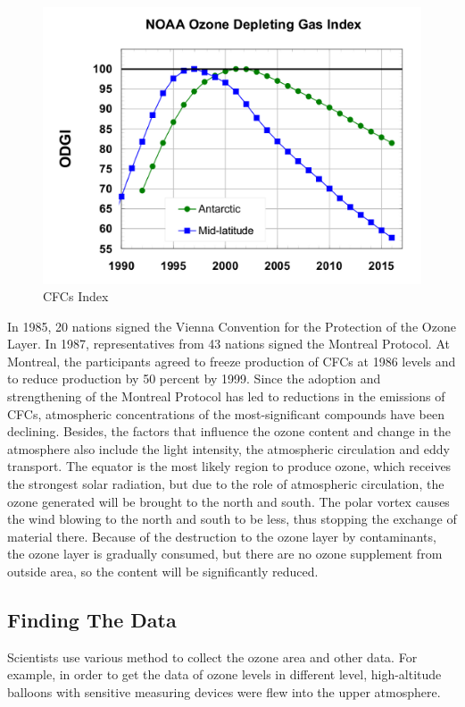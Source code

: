 \documentclass[12pt]{article}
\begin{document}
\begin{center}
\begin{figure}[htpb]
\centering
\includegraphics[scale=0.9]{cfc_index}
\caption{CFCs Index \cite{noaa.gov}}\label{fig:CFCs index}
\end{figure}
\end{center}



In 1985, 20 nations signed the Vienna Convention for the Protection of the Ozone Layer. In 1987, representatives from 43 nations signed the Montreal Protocol. At Montreal, the participants agreed to freeze production of CFCs at 1986 levels and to reduce production by 50 percent by 1999. Since the adoption and strengthening of the Montreal Protocol has led to reductions in the emissions of CFCs, atmospheric concentrations of the most-significant compounds have been declining.   Besides, the factors that influence the ozone content and change in the atmosphere also include the light intensity, the atmospheric circulation and eddy transport. The equator is the most likely region to produce ozone, which receives the strongest solar radiation, but due to the role of atmospheric circulation, the ozone generated will be brought to the north and south. The polar vortex causes the wind blowing to the north and south to be less, thus stopping the exchange of material there. Because of the destruction to the ozone layer by contaminants, the ozone layer is gradually consumed, but there are no ozone supplement from outside area, so the content will be significantly reduced.
\subsection{Finding The Data}
Scientists use various method to collect the ozone area and other data. For example, in order to get the data of ozone levels in different level, high-altitude balloons with sensitive measuring devices were flew into the upper atmosphere.\cite{OzoneHoleWatch}
\end{document}
